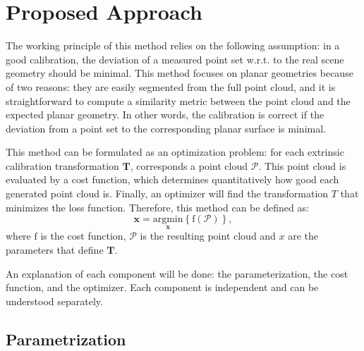 \documentclass[conference]{IEEEtran}
\begin{document}
\section{Proposed Approach}
\label{section:proposed_approach}

The working principle of this method relies on the following assumption: in a good calibration, the deviation of a measured point set w.r.t. to the real scene geometry should be minimal. This method focuses on planar geometries because of two reasons: they are easily segmented from the full point cloud, and it is straightforward to compute a similarity metric between the point cloud and the expected planar geometry. In other words, the calibration is correct if the deviation from a point set to the corresponding planar surface is minimal.

This method can be formulated as an optimization problem: for each extrinsic calibration transformation $\mathbf{T}$, corresponds a point cloud $\mathcal{P}$. This point cloud is evaluated by a cost function, which determines quantitatively how good each generated point cloud is. Finally, an optimizer will find the transformation $T$ that minimizes the loss function. Therefore, this method can be defined as:
%
\begin{equation}
    \mathbf{\mathbf{x}} = \underset{\mathbf{x}}{\mathrm{argmin}} \left\{ \mathrm{f}(\mathcal{P}) \right\},
\end{equation}
%
\noindent where $\mathrm{f}$ is the cost function, $\mathcal{P}$ is the resulting point cloud and $x$ are the parameters that define $\mathbf{T}$.

An explanation of each component will be done: the parameterization, the cost function, and the optimizer. Each component is independent and can be understood separately.

\subsection{Parametrization}
\end{document}
